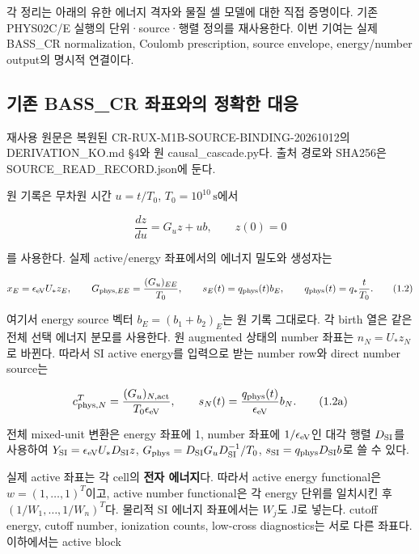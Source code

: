 \documentclass[11pt,a4paper]{article}
\begin{document}
각 정리는 아래의 유한 에너지 격자와 물질 셀 모델에 대한 직접 증명이다. 기존 PHYS02C/E 실행의 단위·source·행렬 정의를 재사용한다. 이번 기여는 실제 BASS\_CR normalization, Coulomb prescription, source envelope, energy/number output의 명시적 연결이다.

\hypertarget{uxae30uxc874-bass_cr-uxc88cuxd45cuxc640uxc758-uxc815uxd655uxd55c-uxb300uxc751}{%
\subsection{기존 BASS\_CR 좌표와의 정확한 대응}\label{uxae30uxc874-bass_cr-uxc88cuxd45cuxc640uxc758-uxc815uxd655uxd55c-uxb300uxc751}}

재사용 원문은 복원된 CR-RUX-M1B-SOURCE-BINDING-20261012의 DERIVATION\_KO.md §4와 원 causal\_cascade.py다. 출처 경로와 SHA256은 SOURCE\_READ\_RECORD.json에 둔다.

원 기록은 무차원 시간 \(u=t/T_0\), \(T_0=10^{10}\,\mathrm{s}\)에서

\[
\frac{dz}{du}=G_u z+u b,\qquad z(0)=0
\tag{1.1}
\]

를 사용한다. 실제 active/energy 좌표에서의 에너지 밀도와 생성자는

\[
x_E=\epsilon_{\rm eV}U_*z_E,\qquad
G_{{\rm phys},EE}=\frac{(G_u)_{EE}}{T_0},\qquad
s_E(t)=q_{\rm phys}(t)b_E,\qquad
q_{\rm phys}(t)=q_*\frac{t}{T_0}.
\tag{1.2}
\]

여기서 energy source 벡터 \(b_E=(b_1+b_2)_E\)는 원 기록 그대로다. 각 birth 열은 같은 전체 선택 에너지 분모를 사용한다. 원 augmented 상태의 number 좌표는 \(n_N=U_*z_N\)로 바뀐다. 따라서 SI active energy를 입력으로 받는 number row와 direct number source는

\[
c_{{\rm phys},N}^T=\frac{(G_u)_{N,\rm act}}{T_0\epsilon_{\rm eV}},
\qquad s_N(t)=\frac{q_{\rm phys}(t)}{\epsilon_{\rm eV}}b_N.
\tag{1.2a}
\]

전체 mixed-unit 변환은 energy 좌표에 1, number 좌표에 \(1/\epsilon_{\rm eV}\)인 대각 행렬 \(D_{\rm SI}\)를 사용하여 \(Y_{\rm SI}=\epsilon_{\rm eV}U_*D_{\rm SI}z\), \(G_{\rm phys}=D_{\rm SI}G_uD_{\rm SI}^{-1}/T_0\), \(s_{\rm SI}=q_{\rm phys}D_{\rm SI}b\)로 쓸 수 있다.

실제 active 좌표는 각 cell의 \textbf{전자 에너지}다. 따라서 active energy functional은 \(w=(1,\ldots,1)^T\)이고, active number functional은 각 energy 단위를 일치시킨 후 \((1/W_1,\ldots,1/W_n)^T\)다. 물리적 SI 에너지 좌표에서는 \(W_j\)도 J로 넣는다. cutoff energy, cutoff number, ionization counts, low-cross diagnostics는 서로 다른 좌표다. 이하에서는 active block
\end{document}
